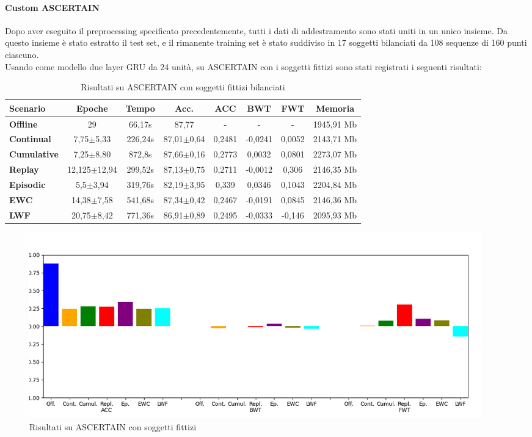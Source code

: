 \paragraph{Custom ASCERTAIN} Dopo aver eseguito il preprocessing specificato precedentemente, tutti i dati di addestramento sono stati uniti in un unico insieme. Da questo insieme è stato estratto il test set, e il rimanente training set è stato suddiviso in 17 soggetti bilanciati da 108 sequenze di 160 punti ciascuno.\\
Usando come modello due layer GRU da 24 unità, su ASCERTAIN con i soggetti fittizi sono stati registrati i seguenti risultati:
\begin{table}[h]
\footnotesize
    \begin{tabular}{l|c|c|c|c|c|c|c}
        \textbf{Scenario} & \textbf{Epoche} & \textbf{Tempo} & \textbf{Acc.} & \textbf{ACC} & \textbf{BWT} & \textbf{FWT} & \textbf{Memoria}\\
        \hline
         \textbf{Offline} & 29 & 66,17s & 87,77 & - & - & - & 1945,91 Mb\\
        \textbf{Continual} & 7,75$\pm$5,33 & 226,24s & 87,01$\pm$0,64 & 0,2481 & -0,0241 & 0,0052 & 2143,71 Mb\\
        \textbf{Cumulative} & 7,25$\pm$8,80 & 872,8s & 87,66$\pm$0,16 & 0,2773 & 0,0032 & 0,0801 & 2273,07 Mb\\
        \textbf{Replay} & 12,125$\pm$12,94 & 299,52s & 87,13$\pm$0,75 & 0,2711 & -0,0012 & 0,306 & 2146,35 Mb\\
        \textbf{Episodic} & 5,5$\pm$3,94 & 319,76s & 82,19$\pm$3,95 & 0,339 & 0,0346 & 0,1043 & 2204,84 Mb\\
        \textbf{EWC} & 14,38$\pm$7,58 & 541,68s & 87,34$\pm$0,42 & 0,2467 & -0,0191 & 0,0845 & 2146,36 Mb\\
        \textbf{LWF} & 20,75$\pm$8,42 & 771,36s & 86,91$\pm$0,89 & 0,2495 & -0,0333 & -0,146 & 2095,93 Mb\\
    \end{tabular}
    \caption{Risultati su ASCERTAIN con soggetti fittizi bilanciati}
    \label{tab:rescustomascertain}
\end{table}
\begin{figure}[h]
	\begin{center}
		\includegraphics[width=0.95\textwidth]{img/graphs/customascertain_final_metrics.png}
		\caption{Risultati su ASCERTAIN con soggetti fittizi}
		\label{fig:customascertain_metrics_graph}
	\end{center}
\end{figure}


